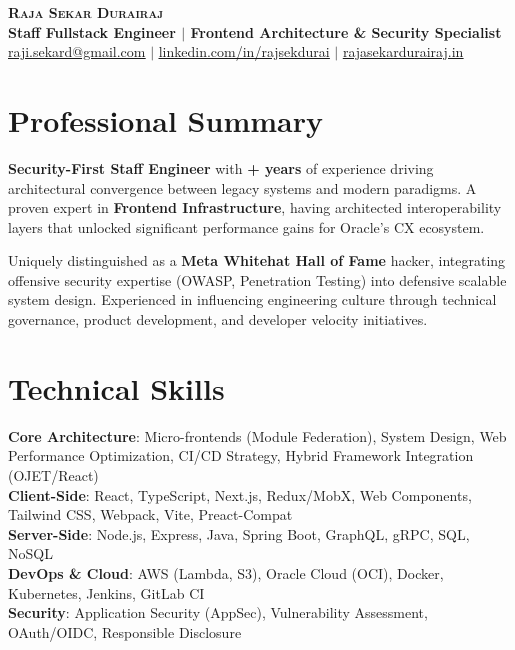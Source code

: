 \documentclass[letterpaper,11pt]{article}
\newcounter{TotalYears}
\begin{document}
\begin{center}
    \textbf{\Huge \scshape Raja Sekar Durairaj} \\ \vspace{5pt}
    \textbf{\large Staff Fullstack Engineer $|$ Frontend Architecture \& Security Specialist} \\ \vspace{5pt}
    \small \href{mailto:raji.sekard@gmail.com}{\underline{raji.sekard@gmail.com}} $|$ 
    \href{https://www.linkedin.com/in/rajsekdurai}{\underline{linkedin.com/in/rajsekdurai}} $|$
    \href{https://www.rajasekardurairaj.in/}{\underline{rajasekardurairaj.in}}
\end{center}


\section{Professional Summary}
\vspace{5pt}
\small{
\textbf{Security-First Staff Engineer} with \textbf{\the\value{TotalYears}+ years} of experience driving architectural convergence between legacy systems and modern paradigms. A proven expert in \textbf{Frontend Infrastructure}, having architected interoperability layers that unlocked significant performance gains for Oracle's CX ecosystem. 

Uniquely distinguished as a \textbf{Meta Whitehat Hall of Fame} hacker, integrating offensive security expertise (OWASP, Penetration Testing) into defensive scalable system design. Experienced in influencing engineering culture through technical governance, product development, and developer velocity initiatives.
}
\vspace{10pt}


\section{Technical Skills}
 \begin{itemize}[leftmargin=0.15in, label={}]
    \small{\item{
     \textbf{Core Architecture}{: Micro-frontends (Module Federation), System Design, Web Performance Optimization, CI/CD Strategy, Hybrid Framework Integration (OJET/React)} \\ \vspace{3pt}
     \textbf{Client-Side}{: React, TypeScript, Next.js, Redux/MobX, Web Components, Tailwind CSS, Webpack, Vite, Preact-Compat} \\ \vspace{3pt}
     \textbf{Server-Side}{: Node.js, Express, Java, Spring Boot, GraphQL, gRPC, SQL, NoSQL} \\ \vspace{3pt}
     \textbf{DevOps \& Cloud}{: AWS (Lambda, S3), Oracle Cloud (OCI), Docker, Kubernetes, Jenkins, GitLab CI} \\ \vspace{3pt}
     \textbf{Security}{: Application Security (AppSec), Vulnerability Assessment, OAuth/OIDC, Responsible Disclosure}
    }}
 \end{itemize}
\end{document}
